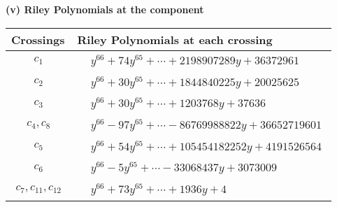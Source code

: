\documentclass[1p]{elsarticle_modified}
\theoremstyle{definition}
\begin{document}
\newpage\renewcommand{\arraystretch}{1}
\flushleft \textbf{(v) Riley Polynomials at the component}\newline \\
\begin{tabular}{m{50pt}|m{274pt}}
Crossings & \hspace{64pt}Riley Polynomials at each crossing \\
\hline $$\begin{aligned}c_{1}\end{aligned}$$&$\begin{aligned}
&y^{66}+74 y^{65}+\cdots+2198907289 y+36372961
\end{aligned}$\\
\hline $$\begin{aligned}c_{2}\end{aligned}$$&$\begin{aligned}
&y^{66}+30 y^{65}+\cdots+1844840225 y+20025625
\end{aligned}$\\
\hline $$\begin{aligned}c_{3}\end{aligned}$$&$\begin{aligned}
&y^{66}+30 y^{65}+\cdots+1203768 y+37636
\end{aligned}$\\
\hline $$\begin{aligned}c_{4},c_{8}\end{aligned}$$&$\begin{aligned}
&y^{66}-97 y^{65}+\cdots-86769988822 y+36652719601
\end{aligned}$\\
\hline $$\begin{aligned}c_{5}\end{aligned}$$&$\begin{aligned}
&y^{66}+54 y^{65}+\cdots+105454182252 y+4191526564
\end{aligned}$\\
\hline $$\begin{aligned}c_{6}\end{aligned}$$&$\begin{aligned}
&y^{66}-5 y^{65}+\cdots-33068437 y+3073009
\end{aligned}$\\
\hline $$\begin{aligned}c_{7},c_{11},c_{12}\end{aligned}$$&$\begin{aligned}
&y^{66}+73 y^{65}+\cdots+1936 y+4
\end{aligned}$\\

\end{tabular}
\end{document}
